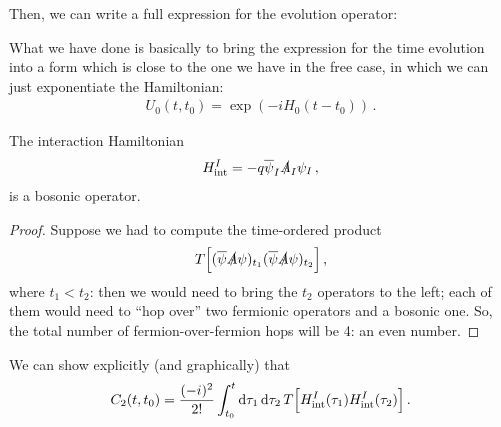 \documentclass[main.tex]{subfiles}
\begin{document}
Then, we can write a full expression for the evolution operator: 
%

%

What we have done is basically to bring the expression for the time evolution into a form which is close to the one we have in the free case, in which we can just exponentiate the Hamiltonian: 
%
\begin{align}
U_0 (t, t_0 ) = \exp( - i H_0 (t - t_0 ))
\,.
\end{align}

\begin{claim}
The interaction Hamiltonian 
%
\begin{align}
H _{\text{int}}^{I} = - q \overline{\psi}_{I} \slashed{A}_{I} \psi_{I}
\,,
\end{align}
%
is a bosonic operator. 
\end{claim}

\begin{proof}
Suppose we had to compute the time-ordered product 
%
\begin{align}
T \qty[
(\overline{\psi}\slashed{A} \psi )_{t_1 }
(\overline{\psi}\slashed{A} \psi )_{t_2 }
]
\,,
\end{align}
%
where \(t_1 < t_2\): then we would need to bring the \(t_2 \) operators to the left; each of them would need to ``hop over'' two fermionic operators and a bosonic one. So, the total number of fermion-over-fermion hops will be 4: an even number.
\end{proof}


We can show explicitly (and graphically) that 
%
\begin{align}
C_2 (t, t_0 ) = \frac{(-i)^2}{2!} 
\int_{t_0 }^{t} \dd{\tau_1} \dd{\tau_2 } T \qty[H _{\text{int}}^{I}(\tau_1 ) H _{\text{int}}^{I} (\tau_2 )]
\,.
\end{align}
\end{document}
